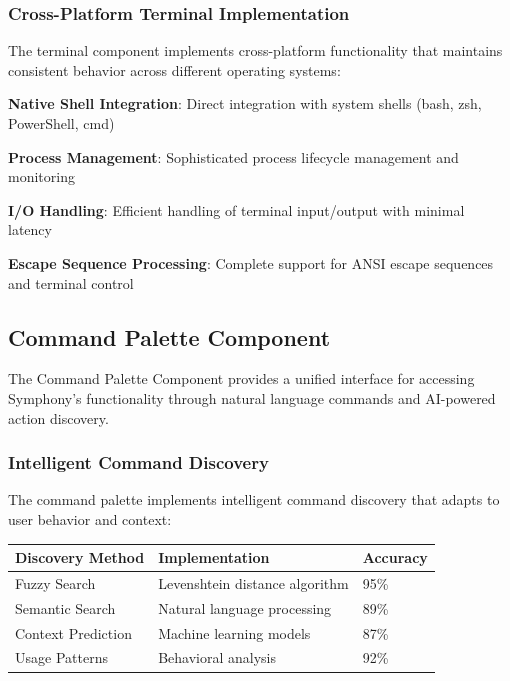 \subsubsection*{Cross-Platform Terminal Implementation}

The terminal component implements cross-platform functionality that maintains consistent behavior across different operating systems:

\begin{expandedlist}
    \item \textbf{Native Shell Integration}: Direct integration with system shells (bash, zsh, PowerShell, cmd)
    \item \textbf{Process Management}: Sophisticated process lifecycle management and monitoring
    \item \textbf{I/O Handling}: Efficient handling of terminal input/output with minimal latency
    \item \textbf{Escape Sequence Processing}: Complete support for ANSI escape sequences and terminal control
\end{expandedlist}

\subsection*{Command Palette Component}

The Command Palette Component provides a unified interface for accessing Symphony's functionality through natural language commands and AI-powered action discovery.

\subsubsection*{Intelligent Command Discovery}

The command palette implements intelligent command discovery that adapts to user behavior and context:

\begin{center}
\begin{tabular}{@{}lll@{}}
\toprule
\textbf{Discovery Method} & \textbf{Implementation} & \textbf{Accuracy} \\
\midrule
Fuzzy Search & Levenshtein distance algorithm & 95\% \\
Semantic Search & Natural language processing & 89\% \\
Context Prediction & Machine learning models & 87\% \\
Usage Patterns & Behavioral analysis & 92\% \\
\bottomrule
\end{tabular}
\end{center}

